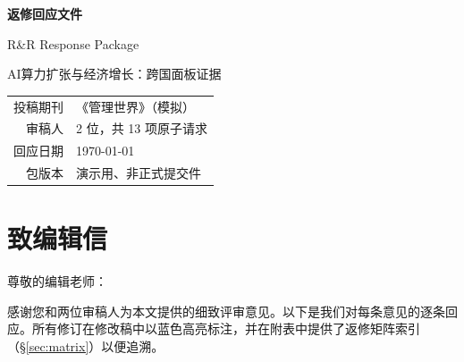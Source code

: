 \documentclass[12pt,a4paper]{ctexart}
\begin{document}
\thispagestyle{empty}
\begin{center}
  \vspace*{6cm}

  {\Huge\bfseries 返修回应文件}

  \vspace{0.8cm}

  {\Large R\&R Response Package}

  \vspace{0.5cm}

  {\large AI算力扩张与经济增长：跨国面板证据}

  \vspace{2cm}

  {\normalsize
    \begin{tabular}{rl}
      投稿期刊 & 《管理世界》（模拟）\\
      审稿人 & 2 位，共 13 项原子请求\\
      回应日期 & \today \\
      包版本 & 演示用、非正式提交件\\
    \end{tabular}
  }

  \vspace{1.5cm}


\end{center}
\newpage

\thispagestyle{empty}
\tableofcontents
\newpage

\section{致编辑信}
\label{sec:editor}

尊敬的编辑老师：

感谢您和两位审稿人为本文提供的细致评审意见。以下是我们对每条意见的逐条回应。所有修订在修改稿中以蓝色高亮标注，并在附表中提供了返修矩阵索引（\S\ref{sec:matrix}）以便追溯。
\end{document}
